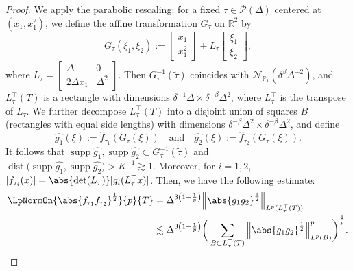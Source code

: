 \documentclass[reqno,centertags,11pt,a4paper]{amsart}
\begin{document}
\begin{proof}
We apply the parabolic rescaling: for a fixed $\tau\in\mathcal{P}(\Delta)$ centered at $(x_1, x_1^2)$, we define the affine transformation $G_\tau$ on $\mathbb{R}^2$ by
\begin{equation*}
    G_\tau(\xi_1,\xi_2):= \begin{bmatrix}
        x_1\\
        x_1^2
        \end{bmatrix} + L_\tau \begin{bmatrix}
        \xi_1\\
        \xi_2
        \end{bmatrix},
\end{equation*} where \( L_\tau = \begin{bmatrix}
        \Delta & 0 \\
        2\Delta x_1 & \Delta^2
        \end{bmatrix} \).
Then $G_\tau^{-1}(\widetilde{\tau})$ coincides with $\mathcal{N}_{\mathbb{P}_1}(\delta^\beta\Delta^{-2})$, and $L_\tau^{\top}({T})$ is a rectangle with dimensions $\delta^{-1}\Delta \times \delta^{-\beta}\Delta^2$, where $L_\tau^\top$ is the transpose of $L_\tau$. We further decompose $L^{\top}_\tau({T})$ into a disjoint union of squares $B$ (rectangles with equal side lengths) with dimensions $\delta^{-\beta}\Delta^2 \times \delta^{-\beta}\Delta^2$, and define
\[
\widehat{g_1}(\xi) := \widehat{f}_{\tau_1}(G_\tau(\xi)) \quad \text{and} \quad \widehat{g_2}(\xi) := \widehat{f}_{\tau_2}(G_\tau(\xi)).
\]
It follows that $\operatorname{supp}\widehat{g_1}, \operatorname{supp}\widehat{g_2} \subset G_\tau^{-1}(\widetilde{\tau})$ and $\operatorname{dist}\bigl(\operatorname{supp}\widehat{g_1},\operatorname{supp}\widehat{g_2}\bigr)>K^{-1}\gtrsim 1$. Moreover, for \(i=1, 2\), \(|f_{\tau_i}(x)| = \abs{\det(L_\tau)} |g_i( L_{\tau}^{\top}x  )|\). Then, we have the following estimate:
\begin{align}\label{bres1}
\LpNormOn{\abs{f_{\tau_1}f_{\tau_2}}^{\frac{1}{2}}}{p}{{T}}
&= \Delta^{3\left(1 - \frac{1}{p}\right)} \Big\|\abs{g_1g_2}^{\frac{1}{2}}\Big\|_{L^p(L_\tau^{\top}({T}))} \\
&\lesssim \Delta^{3\left(1 - \frac{1}{p}\right)} \bigg(\sum_{B\subset L_\tau^{\top}({T})} \Big\|\abs{g_1g_2}^{\frac{1}{2}}\Big\|_{L^p(B)}^p\bigg)^{\frac{1}{p}}. \nonumber
\end{align}


\end{proof}
\end{document}
